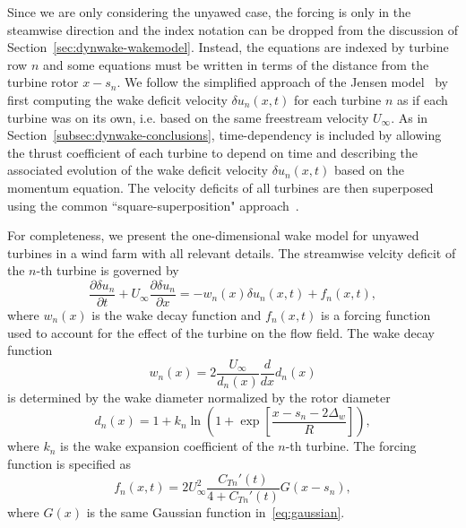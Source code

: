Since we are only considering the unyawed case, the forcing is only in the steamwise direction and the index notation can be dropped from the discussion of Section~\ref{sec:dynwake-wakemodel}. Instead, the equations are indexed by turbine row $n$ and some equations must be written in terms of the distance from the turbine rotor $x-s_n$. We follow the simplified approach of the Jensen model~\cite{Katic1986a} by first computing the wake deficit velocity $\delta u_n(x,t)$ for each turbine $n$ as if each turbine was on its own, i.e. based on the same freestream velocity $U_\infty$. As in Section~\ref{subsec:dynwake-conclusions}, time-dependency is included by allowing the  thrust coefficient of each turbine  to depend on time  and describing the associated evolution of the wake deficit velocity $\delta u_n(x,t)$ based on the momentum equation. The velocity deficits of all turbines are then superposed using the common ``square-superposition" approach~\cite{Katic1986a}. 

For completeness, we present the one-dimensional wake model for unyawed turbines in a wind farm with all relevant details. The streamwise velcity deficit of the $n$-th turbine is governed by
\begin{equation}
\label{eq:delta_un}
\frac{\partial \delta u_n}{\partial t} + U_\infty \frac{\partial \delta u_n}{\partial x} = -w_n(x) \delta u_n(x,t) + f_n(x,t),
\end{equation}
where $w_n(x)$ is the wake decay function and $f_n(x,t)$ is a forcing function used to account for the effect of the turbine on the flow field. The wake decay function
\begin{equation}
w_n(x) = 2 \frac{U_\infty}{d_n(x)} \frac{d}{dx}d_n(x)
\end{equation}
is determined by the wake diameter normalized by the rotor diameter 
\begin{equation}
d_n(x) = 1 + k_n\ln \left(1 + \exp \left[\frac{x-s_n-2\Delta_w}{R}\right]\right),
\end{equation}
where $k_n$ is the wake expansion coefficient of the $n$-th turbine. The forcing function is specified as
\begin{equation}
\label{eq:forcing}
f_n(x,t) = 2 U_\infty^2  \frac{C_{Tn}'(t)}{4 + C_{Tn}'(t)} G(x-s_n),
\end{equation}
where $G(x)$ is the same Gaussian function in~\eqref{eq:gaussian}.

